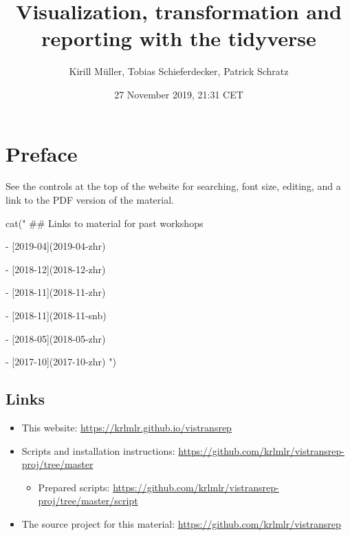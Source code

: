 \documentclass[]{book}
\title{Visualization, transformation and reporting with the tidyverse}
\author{Kirill Müller, Tobias Schieferdecker, Patrick Schratz}
\date{27 November 2019, 21:31 CET}
\newenvironment{Shaded}{}{}
\newcommand{\KeywordTok}[1]{\textcolor[rgb]{0.00,0.00,1.00}{#1}}
\newcommand{\NormalTok}[1]{#1}
\newcommand{\StringTok}[1]{\textcolor[rgb]{0.00,0.50,0.50}{#1}}
\providecommand{\tightlist}{%
  \setlength{\itemsep}{0pt}\setlength{\parskip}{0pt}}
\begin{document}
\maketitle

{
\setcounter{tocdepth}{1}
\tableofcontents
}
\hypertarget{preface}{%
\chapter*{Preface}\label{preface}}

See the controls at the top of the website for searching, font size, editing, and a link to the PDF version of the material.

\begin{Shaded}
\begin{Highlighting}[]
\KeywordTok{cat}\NormalTok{(}\StringTok{"}
\StringTok{## Links to material for past workshops}

\StringTok{- [2019-04](2019-04-zhr)}

\StringTok{- [2018-12](2018-12-zhr)}

\StringTok{- [2018-11](2018-11-zhr)}

\StringTok{- [2018-11](2018-11-snb)}

\StringTok{- [2018-05](2018-05-zhr)}

\StringTok{- [2017-10](2017-10-zhr)}
\StringTok{"}\NormalTok{)}
\end{Highlighting}
\end{Shaded}

\hypertarget{links}{%
\section*{Links}\label{links}}

\begin{itemize}
\item
  This website: \url{https://krlmlr.github.io/vistransrep}
\item
  Scripts and installation instructions: \url{https://github.com/krlmlr/vistransrep-proj/tree/master}

  \begin{itemize}
  \tightlist
  \item
    Prepared scripts: \url{https://github.com/krlmlr/vistransrep-proj/tree/master/script}
  \end{itemize}
\item
  The source project for this material: \url{https://github.com/krlmlr/vistransrep}
\end{itemize}
\end{document}
